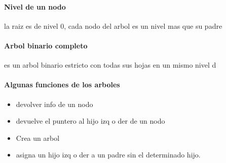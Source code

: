 \documentclass[10pt]{article}
\begin{document}
\paragraph{Nivel de un nodo} la raiz es de nivel 0, cada nodo del arbol es un nivel mas que su padre
\paragraph{Arbol binario completo} es un arbol binario estricto con todas sus hojas en un mismo nivel d

\paragraph{Algunas funciones de los arboles}
\begin{itemize}
	\item  devolver info de un nodo
	\item devuelve el puntero al hijo izq o der de un nodo
	\item Crea un arbol
	\item asigna un hijo izq o der a un padre sin el determinado hijo.
\end{itemize}
\end{document}
